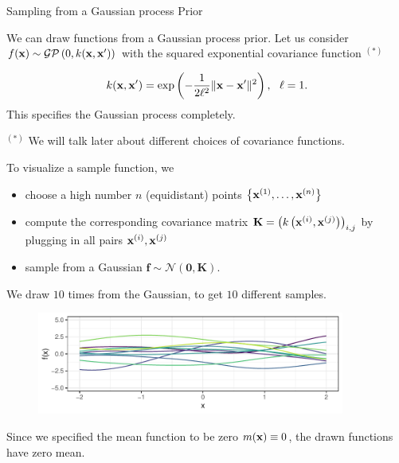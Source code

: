 \documentclass[11pt,compress,t,notes=noshow, xcolor=table]{beamer}
\begin{document}
\begin{vbframe}{Sampling from a Gaussian process Prior}

We can draw functions from a Gaussian process prior. Let us consider $f(\mathbf{x}) \sim \mathcal{GP}\left(0, k(\mathbf{x}, \mathbf{x}^\prime)\right)$ with the squared exponential covariance function $^{(*)}$

$$
k(\mathbf{x}, \mathbf{x}^\prime) = \exp\left(-\frac{1}{2\ell^2}\|\mathbf{x} - \mathbf{x}^\prime\|^2\right), ~~ \ell = 1.
$$
\vspace{-4cm}
This specifies the Gaussian process completely. 

\vspace{8cm}
\footnotesize
$^{(*)}$ We will talk later about different choices of covariance functions. 

\normalsize

\framebreak 

To visualize a sample function, we 

\begin{itemize}
  \item choose a high number $n$ (equidistant) points $\left\{\mathbf{x}^{(1)}, \dots, \mathbf{x}^{(n)}\right\}$
  \item compute the corresponding covariance matrix $\mathbf{K} = \left(k\left(\mathbf{x}^{(i)}, \mathbf{x}^{(j)}\right)\right)_{i,j}$ by plugging in all pairs $\mathbf{x}^{(i)}, \mathbf{x}^{(j)}$ 
  \item sample from a Gaussian $\bm{f} \sim \mathcal{N}(\bm{0}, \bm{K})$. 
\end{itemize}

We draw $10$ times from the Gaussian, to get $10$ different samples.  



\begin{figure}
  \includegraphics[width=0.9\textwidth]{figure/gp_sample/different_samples.pdf}
\end{figure}

\vspace{-0.2cm}
Since we specified the mean function to be zero $m(\mathbf{x}) \equiv 0$, the drawn functions have zero mean.

\end{vbframe}
\end{document}
